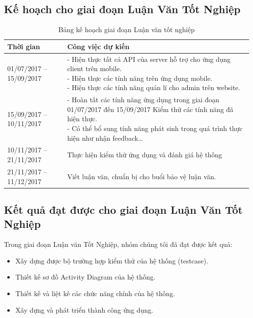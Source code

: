 \documentclass[a4paper]{article}
\begin{document}
\subsection*{Kế hoạch cho giai đoạn Luận Văn Tốt Nghiệp}
\begin{table}[h]
\centering
\begin{tabular}{|l|m{9.5cm}|}
\hline
\textbf{Thời gian} & \textbf{Công việc dự kiến}                                                                                                                                                                           \\\hline
01/07/2017 – 15/09/2017    & \pbox{9.5cm}{- Hiện thực tất cả API của server hỗ trợ cho ứng dụng client trên mobile.\\ - Hiện thực các tính năng trên ứng dụng mobile.\\ - Hiện thực các tính năng quản lí cho admin trên website.              } \\\hline
15/09/2017 – 10/11/2017  & \pbox{9.5cm}{- Hoàn tất các tính năng ứng dụng trong giai đoạn 01/07/2017 đến 15/09/2017 Kiểm thử các tính năng đã hiện thực.\\- Có thể bổ sung tính năng phát sinh trong quá trình thực hiện như nhận feedback…} \\\hline
10/11/2017 – 21/11/2017 & Thực hiện kiểm thử ứng dụng và đánh giá hệ thống                                                                                                                                            \\\hline
21/11/2017 – 11/12/2017 & Viết luận văn, chuẩn bị cho buổi bảo vệ luận văn.                                                                                                                                          \\\hline
\end{tabular}
\caption{Bảng kế hoạch giai đoạn Luận văn tốt nghiệp}
\label{my-label}
\end{table}
\subsection*{Kết quả đạt được cho giai đoạn Luận Văn Tốt Nghiệp}
Trong giai đoạn Luận văn Tốt Nghiệp, nhóm chúng tôi đã đạt được kết quả:
\begin{itemize}
\item Xây dựng được bộ trường hợp kiểm thử của hệ thống (testcase).
\item Thiết kế sơ đồ Activity Diagram của hệ thống.
\item Thiết kế và liệt kê các chức năng chính của hệ thống.
\item Xây dựng và phát triển thành công ứng dụng.
\end{itemize}
\end{document}
